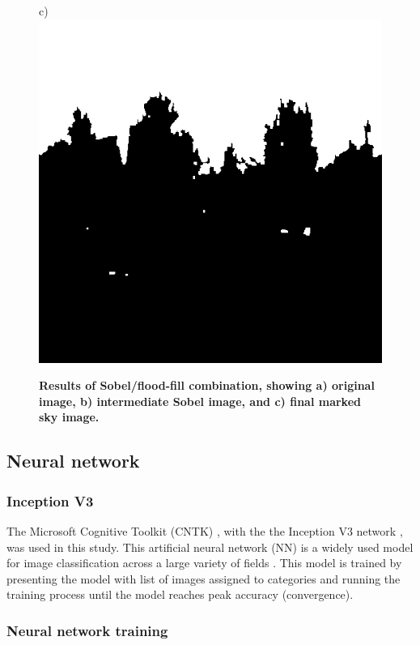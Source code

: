 \documentclass[final,3p,times,authoryear]{elsarticle}
\begin{document}
\begin{figure}
{c)\includegraphics[scale=0.25]{Images/FloodfillOutput.png}
}
\caption{\bf   Results of Sobel/flood-fill combination, showing a) original image, b) intermediate Sobel image, and c) final marked sky image.}    
 \label{fig:sobelflood}  
\end{figure} 

\subsection{Neural network}\label{sec:nn}

\subsubsection{Inception V3}\label{sec:inception}
The Microsoft Cognitive Toolkit (CNTK) \citep{Yu2015,Agarwal2016}, with the the Inception V3 network \citep{Szegedy2015a}, was used in this study. This artificial neural network (NN) is a widely used model for image classification across a large variety of fields \citep{Xia2017,Hassannejad2016}. This model is trained by presenting the model with list of images assigned to categories and running the training process until the model reaches peak accuracy (convergence).


\subsubsection{Neural network training}\label{sec:nntraining}    
\end{document}
